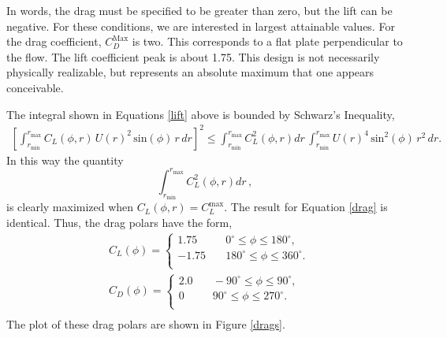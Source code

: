 \documentclass{article}
\begin{document}
In words, the drag must be specified to be greater than zero, but
the lift can be negative. For these conditions, we are interested in
largest attainable values. For the drag coefficient, $C_D^{\text{Max}}$
is two. %
This corresponds to a flat plate perpendicular to the flow.
The lift coefficient peak is about 1.75. This design is not necessarily
physically realizable, but represents an absolute maximum that one
appears conceivable. 

The integral shown in Equations \ref{lift} above is bounded by 
Schwarz's Inequality,  
\begin{align}
  \left[\int_{r_{\text{min}}}^{r_{\text{max}}} C_L(\phi,r)\, U(r)^2
 \,\text{sin}(\phi)\, r\,dr \right]^2 \le 
 \int_{r_{\text{min}}}^{r_{\text{max}}} C_L^2(\phi,r) dr \,
 \int_{r_{\text{min}}}^{r_{\text{max}}} U(r)^4 
 \,\text{sin}^2(\phi)\, r^2\,dr.
\end{align}
In this way the quantity
\begin{equation}
 \int_{r_{\text{min}}}^{r_{\text{max}}} C_L^2(\phi,r) dr \,, 
\end{equation}
is clearly maximized when $C_L(\phi,r) = C_L^{\text{max}}$. 
The result for Equation \ref{drag} is identical. Thus, the drag polars
have the form, 
\begin{align*} 
 &C_L(\phi) = 
  \begin{cases}
    1.75& \quad 0^{\circ} \le \phi \le 180^{\circ}, \\
   -1.75& \quad 180^{\circ} \le \phi \le 360^{\circ}.  \\
  \end{cases}\\
 &C_D(\phi) = 
  \begin{cases}
    2.0& \quad -90^{\circ} \le \phi \le 90^{\circ}, \\
      0& \quad 90^{\circ} \le \phi \le 270^{\circ}.  \\
  \end{cases}\\
\end{align*}
The plot of these drag polars are shown in Figure \ref{drags}. 
\end{document}
